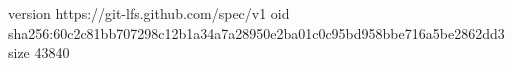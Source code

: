 version https://git-lfs.github.com/spec/v1
oid sha256:60c2c81bb707298c12b1a34a7a28950e2ba01c0c95bd958bbe716a5be2862dd3
size 43840
